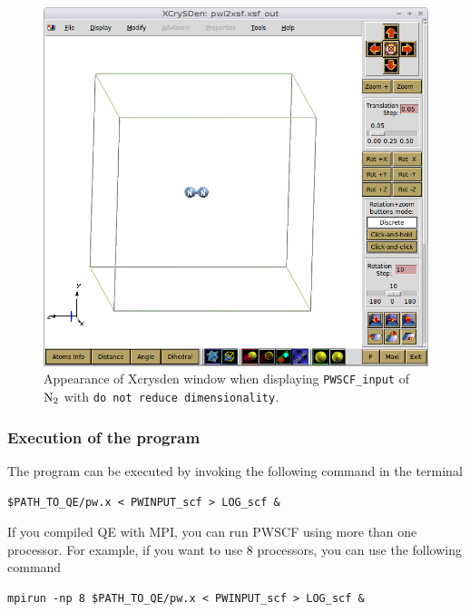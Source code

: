 \documentclass[12pt,english]{paper}
\begin{document}
\begin{figure}[H]
\noindent \begin{centering}
\includegraphics[scale=0.3]{images/N2}
\par\end{centering}

\caption{Appearance of Xcrysden window when displaying \texttt{PWSCF\_input}
of $\ce{N2}$ with \texttt{do not reduce dimensionality}. \label{fig:dia2}}
\end{figure}



\subsubsection{Execution of the program}

The program can be executed by invoking the following command in the
terminal

\begin{lstlisting}
$PATH_TO_QE/pw.x < PWINPUT_scf > LOG_scf &
\end{lstlisting}


If you compiled QE with MPI, you can run PWSCF using more than one
processor. For example, if you want to use 8 processors, you can use
the following command

\begin{lstlisting}
mpirun -np 8 $PATH_TO_QE/pw.x < PWINPUT_scf > LOG_scf &
\end{lstlisting}
\end{document}
